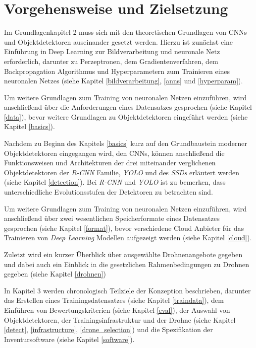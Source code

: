 \section{Vorgehensweise und Zielsetzung}

Im Grundlagenkapitel 2 muss sich mit den theoretischen Grundlagen von CNNs und Objektdetektoren auseinander gesetzt werden. Hierzu ist zunächst eine Einführung in Deep Learning zur Bildverarbeitung und neuronale Netz erforderlich, darunter zu Perzeptronen, dem Gradientenverfahren, dem Backpropagation Algorithmus und Hyperparametern zum Trainieren eines neuronalen Netzes (siehe Kapitel \ref{bildverarbeitung}, \ref{anns} und \ref{hyperparam}). 

Um weitere Grundlagen zum Training von neuronalen Netzen einzuführen, wird anschließend über die Anforderungen eines Datensatzes gesprochen (siehe Kapitel \ref{data}), bevor weitere Grundlagen zu Objektdetektoren eingeführt werden (siehe Kapitel \ref{basics}). 

Nachdem zu Beginn des Kapitels \ref{basics} kurz auf den Grundbaustein moderner Objektdetektoren eingegangen wird, den CNNs, können anschließend die Funktionsweisen und Architekturen der drei miteinander verglichenen Objektdetektoren der \textit{R-CNN} Familie, \textit{YOLO} und des \textit{SSDs} erläutert werden (siehe Kapitel \ref{detection}). Bei \textit{R-CNN} und \textit{YOLO} ist zu bemerken, dass unterschiedliche Evolutionsstufen der Detektoren zu betrachten sind.

Um weitere Grundlagen zum Training von neuronalen Netzen einzuführen, wird anschließend über zwei wesentlichen Speicherformate eines Datensatzes gesprochen (siehe Kapitel \ref{format}), bevor verschiedene Cloud Anbieter für das Trainieren von \textit{Deep Learning} Modellen aufgezeigt werden (siehe Kapitel \ref{cloud}). 

Zuletzt wird ein kurzer Überblick über ausgewählte Drohnenangebote gegeben und dabei auch ein Einblick in die gesetzlichen Rahmenbedingungen zu Drohnen gegeben (siehe Kapitel \ref{drohnen})

In Kapitel 3 werden chronologisch Teilziele der Konzeption beschrieben, darunter das Erstellen eines Trainingsdatensatzes (siehe Kapitel \ref{traindata}), dem Einführen von Bewertungskriterien (siehe Kapitel \ref{eval}), der Auswahl von Objektdetektoren, der Trainingsinfrastruktur und der Drohne (siehe Kapitel \ref{detect}, \ref{infrastructure}, \ref{drone_selection}) und die Spezifikation der Inventursoftware (siehe Kapitel \ref{software}).

